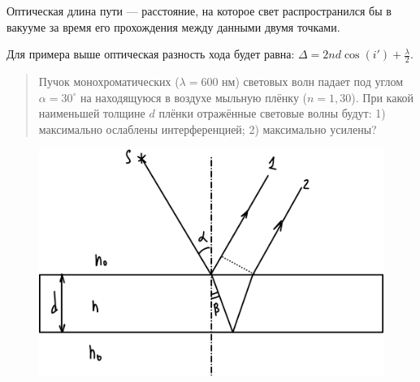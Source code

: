 Оптическая длина пути --- расстояние, на которое свет распространился бы в вакууме за время его прохождения между данными двумя точками.

Для примера выше оптическая разность хода будет равна: $\Delta=2nd\cos(i')+\frac{\lambda}2$.

\newpage
{}
\begin{quote}
    Пучок монохроматических ($\lambda= 600$ нм) световых волн падает под углом $\alpha= 30^\circ$ на находящуюся в воздухе мыльную плёнку ($n = 1,30$). При какой наименьшей толщине $d$ плёнки отражённые световые волны будут: 1) максимально ослаблены интерференцией; 2) максимально  усилены?
\end{quote}
\begin{figure}[H]
    \centering
    \includegraphics[width=0.5\linewidth]{figs/IMG_20250928_220659_551.jpg}
\end{figure}

